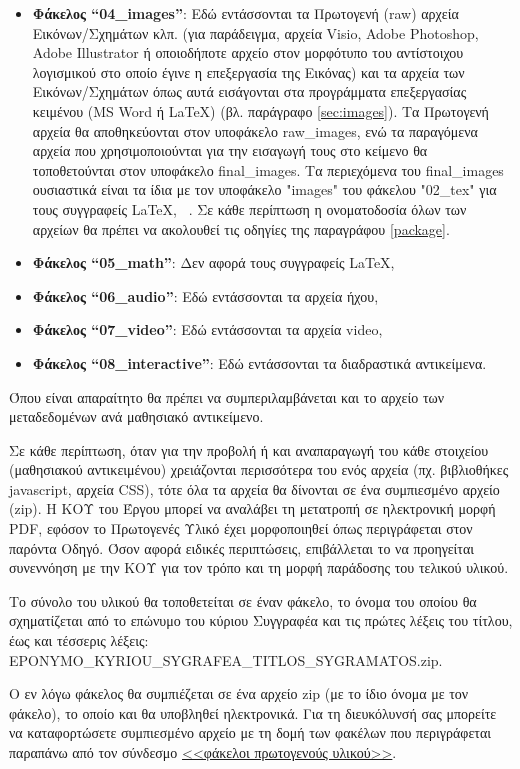\begin{itemize}
αποτελούν μαθησιακό αντικείμενο, συμπεριλαμβανομένων και των μεταδεδομένων
(βλ. παράγραφο \ref{par:metadata}). Με εξαίρεση τυχόν μεταδεδομένα οι συγγραφείς \LaTeX, \XeLaTeX\ δεν χρειάζεται να συμπεριλάβουν Πίνακες σε αυτόν τον φάκελο, εκτός εάν έχουν ενσωματώσει στο βιβλίο τους Πίνακες με τη μορφή pdf (βλέπε σχετικά σελ. \pageref{subsub:tables}).
\item \textbf{Φάκελος “04\_images”}: Εδώ εντάσσονται τα Πρωτογενή (raw) αρχεία
Εικόνων/Σχημάτων κλπ. (για παράδειγμα, αρχεία Visio, Adobe Photoshop, Adobe
Illustrator ή οποιοδήποτε αρχείο στον μορφότυπο του αντίστοιχου λογισμικού στο
οποίο έγινε η επεξεργασία της Εικόνας) και τα αρχεία των Εικόνων/Σχημάτων όπως
αυτά εισάγονται στα προγράμματα επεξεργασίας κειμένου (MS Word ή \LaTeX)
(βλ. παράγραφο \ref{sec:images}). Τα Πρωτογενή αρχεία θα αποθηκεύονται στον υποφάκελο
raw\_images, ενώ τα παραγόμενα αρχεία που χρησιμοποιούνται για την εισαγωγή
τους στο κείμενο θα τοποθετούνται στον υποφάκελο final\_images. Τα περιεχόμενα του final\_images
ουσιαστικά είναι τα ίδια με τον υποφάκελο "images" του φάκελου "02\_tex" για τους συγγραφείς
\LaTeX, \XeLaTeX~. Σε κάθε περίπτωση η ονοματοδοσία όλων των αρχείων θα πρέπει να ακολουθεί τις
οδηγίες της παραγράφου \ref{package}.
\item \textbf{Φάκελος “05\_math”}: Δεν αφορά τους συγγραφείς \LaTeX, \XeLaTeX\,
\item \textbf{Φάκελος “06\_audio”}: Εδώ εντάσσονται τα αρχεία ήχου,
\item \textbf{Φάκελος “07\_video”}: Εδώ εντάσσονται τα αρχεία video,
\item \textbf{Φάκελος “08\_interactive”}: Εδώ εντάσσονται τα διαδραστικά αντικείμενα.
\end{itemize}

Όπου είναι απαραίτητο θα πρέπει να συμπεριλαμβάνεται και το αρχείο των μεταδεδομένων
ανά μαθησιακό αντικείμενο.

Σε κάθε περίπτωση, όταν για την προβολή ή και αναπαραγωγή του κάθε στοιχείου
(μαθησιακού αντικειμένου) χρειάζονται περισσότερα του ενός αρχεία (πχ. βιβλιοθήκες
javascript, αρχεία CSS), τότε όλα τα αρχεία θα δίνονται σε ένα συμπιεσμένο αρχείο (zip).
Η ΚΟΥ του Έργου μπορεί να αναλάβει τη μετατροπή σε ηλεκτρονική μορφή PDF, εφόσον
το Πρωτογενές Υλικό έχει μορφοποιηθεί όπως περιγράφεται στον παρόντα Οδηγό.
Όσον αφορά ειδικές περιπτώσεις, επιβάλλεται το να προηγείται συνεννόηση με την ΚΟΥ
για τον τρόπο και τη μορφή παράδοσης του τελικού υλικού.

Το σύνολο του υλικού θα τοποθετείται σε έναν φάκελο, το όνομα του
οποίου θα σχηματίζεται από το επώνυμο του κύριου Συγγραφέα και τις πρώτες λέξεις του
τίτλου, έως και τέσσερις λέξεις:\\
EPONYMO\_KYRIOU\_SYGRAFEA\_TITLOS\_SYGRAMATOS.zip.

Ο εν λόγω φάκελος θα συμπιέζεται σε ένα αρχείο zip (με το ίδιο όνομα με τον φάκελο), το οποίο και θα υποβληθεί ηλεκτρονικά. Για τη διευκόλυνσή σας μπορείτε να καταφορτώσετε συμπιεσμένο αρχείο με τη δομή των φακέλων που περιγράφεται παραπάνω από τον σύνδεσμο \href{https://www.kallipos.gr/images/kalliposplus/A4/EPONYMO_KYRIOU_SYGRAFEA_TITLOS_SYGRAMATOS.zip} {<<φάκελοι πρωτογενούς υλικού>>}.
